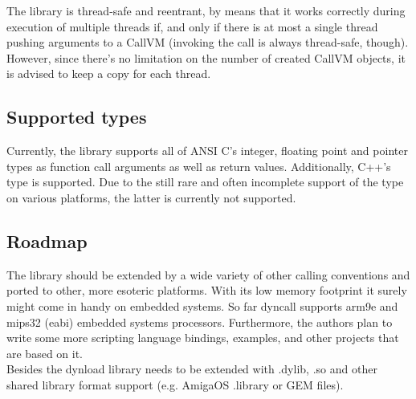 The  library is thread-safe and reentrant, by means that it
works correctly during execution of multiple threads if, and only if there is
at most a single thread pushing arguments to a CallVM (invoking the call is
always thread-safe, though). However, since there's no limitation on the
number of created CallVM objects, it is advised to keep a copy for each
thread.


\subsection{Supported types}

Currently, the  library supports all of ANSI C's integer,
floating point and pointer types as function call arguments as well as return
values. Additionally, C++'s  type is supported. Due to the still
rare and often incomplete support of the  type on various
platforms, the latter is currently not supported.


\subsection{Roadmap}

The  library should be extended by a wide variety of other
calling conventions and ported to other, more esoteric platforms. With its low
memory footprint it surely might come in handy on embedded systems. So far
dyncall supports arm9e and mips32 (eabi) embedded systems processors.
Furthermore, the authors plan to write some more scripting language bindings,
examples, and other projects that are based on it.\\
Besides  the dynload library needs to be extended with
.dylib, .so and other shared library format support (e.g. AmigaOS .library or
GEM \cite{.ldg} files).

